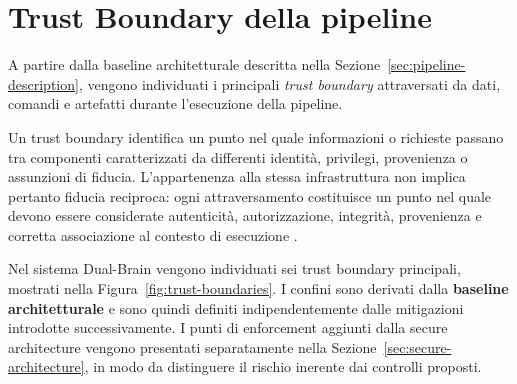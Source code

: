 \documentclass[11pt,a4paper]{article}
\begin{document}

\section{Trust Boundary della pipeline}
\label{sec:trust-boundaries}

A partire dalla baseline architetturale descritta nella
Sezione~\ref{sec:pipeline-description}, vengono individuati i principali
\emph{trust boundary} attraversati da dati, comandi e artefatti durante
l'esecuzione della pipeline.

Un trust boundary identifica un punto nel quale informazioni o richieste
passano tra componenti caratterizzati da differenti identità, privilegi,
provenienza o assunzioni di fiducia. L'appartenenza alla stessa
infrastruttura non implica pertanto fiducia reciproca: ogni
attraversamento costituisce un punto nel quale devono essere considerate
autenticità, autorizzazione, integrità, provenienza e corretta
associazione al contesto di esecuzione
\cite{owaspagentic,owaspagenticthreats}.

Nel sistema Dual-Brain vengono individuati sei trust boundary principali,
mostrati nella Figura~\ref{fig:trust-boundaries}. I confini sono derivati
dalla \textbf{baseline architetturale} e sono quindi definiti
indipendentemente dalle mitigazioni introdotte successivamente.
I punti di enforcement aggiunti dalla secure architecture vengono
presentati separatamente nella Sezione~\ref{sec:secure-architecture},
in modo da distinguere il rischio inerente dai controlli proposti.
\end{document}
